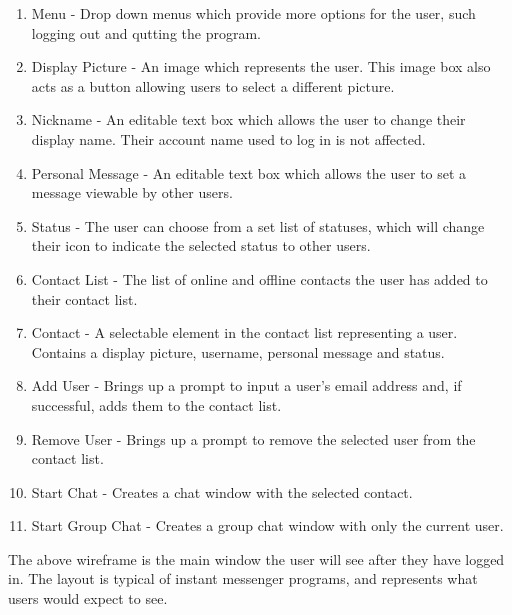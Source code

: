 \begin{enumerate}

\item Menu - Drop down menus which provide more options for the user, such logging out and qutting the program.
 
\item Display Picture - An image which represents the user. This image box also acts as a button allowing users to select a different picture.

\item Nickname - An editable text box which allows the user to change their display name. Their account name used to log in is not affected.

\item Personal Message - An editable text box which allows the user to set a message viewable by other users.

\item Status - The user can choose from a set list of statuses, which will change their icon to indicate the selected status to other users.

\item Contact List - The list of online and offline contacts the user has added to their contact list.

\item Contact - A selectable element in the contact list representing a user. Contains a display picture, username, personal message and status.

\item Add User - Brings up a prompt to input a user's email address and, if successful, adds them to the contact list.

\item Remove User - Brings up a prompt to remove the selected user from the contact list.

\item Start Chat - Creates a chat window with the selected contact.

\item Start Group Chat - Creates a group chat window with only the current user.

\end{enumerate}

The above wireframe is the main window the user will see after they have logged in. The layout is typical of instant messenger programs, and represents what users would expect to see.

